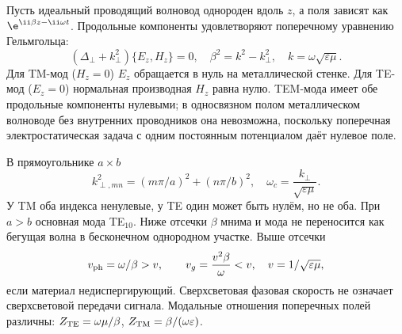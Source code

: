 
Пусть идеальный проводящий волновод однороден вдоль $z$, а поля зависят как $\e^{\ii\beta z-\ii\omega t}$. Продольные компоненты удовлетворяют поперечному уравнению Гельмгольца:
\begin{equation}
 (\Delta_\perp+k_\perp^2)\{E_z,H_z\}=0,\quad
 \beta^2=k^2-k_\perp^2,\quad k=\omega\sqrt{\varepsilon\mu}.
\end{equation}
Для TM-мод ($H_z=0$) $E_z$ обращается в нуль на металлической стенке. Для TE-мод ($E_z=0$) нормальная производная $H_z$ равна нулю. TEM-мода имеет обе продольные компоненты нулевыми; в односвязном полом металлическом волноводе без внутренних проводников она невозможна, поскольку поперечная электростатическая задача с одним постоянным потенциалом даёт нулевое поле.

В прямоугольнике $a\times b$
\begin{equation}
 k_{\perp,mn}^2=(m\pi/a)^2+(n\pi/b)^2,\quad
 \omega_c=\frac{k_\perp}{\sqrt{\varepsilon\mu}}.
\end{equation}
У TM оба индекса ненулевые, у TE один может быть нулём, но не оба. При $a>b$ основная мода TE$_{10}$. Ниже отсечки $\beta$ мнима и мода не переносится как бегущая волна в бесконечном однородном участке. Выше отсечки
\begin{equation}
 v_{\rm ph}=\omega/\beta>v,\qquad v_g=\frac{v^2\beta}{\omega}<v,
 \quad v=1/\sqrt{\varepsilon\mu},
\end{equation}
если материал недиспергирующий. Сверхсветовая фазовая скорость не означает сверхсветовой передачи сигнала. Модальные отношения поперечных полей различны: $Z_{\rm TE}=\omega\mu/\beta$, $Z_{\rm TM}=\beta/(\omega\varepsilon)$.
